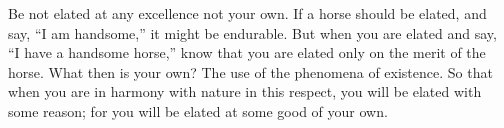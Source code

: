 Be not elated at any excellence not your own. If a horse should be
elated, and say, ``I am handsome,'' it might be endurable. But when you are
elated and say, ``I have a handsome horse,'' know that you are elated only
on the merit of the horse. What then is your own? The use of the
phenomena of existence. So that when you are in harmony with nature in
this respect, you will be elated with some reason; for you will be elated
at some good of your own.

